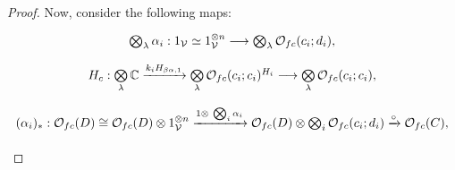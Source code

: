 \documentclass[a4paper,10pt
,draft
]{article}%
\renewcommand{\1}{\eta}%
\begin{document}
\begin{proof}
      Now, consider the following maps:
      \begin{equation}
            \begin{tikzcd}[row sep = tiny]
                  \bigotimes_\lambda \alpha_i: 1_\V \simeq 1_\V^{\otimes n} \longrightarrow \bigotimes_\lambda \O_{f c}(c_i;d_i),
                  \\ %
                  H_c: \bigotimes\limits_\lambda \mathbb C \xrightarrow{k_i H_{\beta\alpha,1}}
                  \bigotimes\limits_\lambda \O_{f c}(c_i;c_i)^{H_i} \longrightarrow
                  \bigotimes\limits_\lambda \O_{f c}(c_i;c_i),
                  \\ %
                  (\alpha_i)_{\**} : 
                  \O_{f c}(D)
                  \cong
                  \O_{f c}(D) \otimes 1_\V^{\otimes n} \xrightarrow{1 \otimes\ \bigotimes_i \alpha_i}
                  \O_{f c}(D) \otimes \bigotimes_i \O_{f c}(c_i;d_i) \xrightarrow{\circ}
                  \O_{f c}(C),
                  \\ %
            \end{tikzcd}
      \end{equation}

\end{proof}
\end{document}
